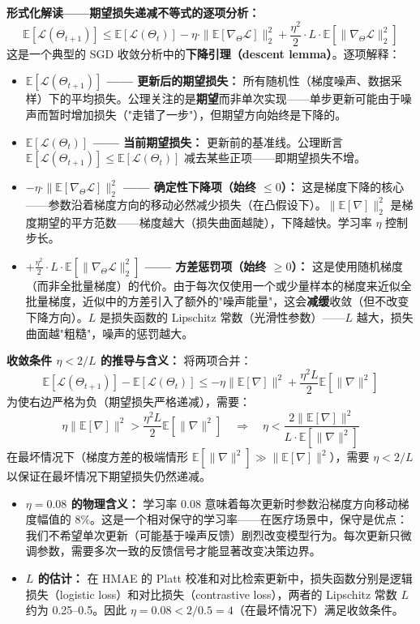 \documentclass[11pt,a4paper]{ctexart}
\theoremstyle{remark}
\begin{document}
\textbf{形式化解读——期望损失递减不等式的逐项分析：}
\[
\mathbb{E}[\mathcal{L}(\Theta_{t+1})] \leq \mathbb{E}[\mathcal{L}(\Theta_t)] - \eta \cdot \|\mathbb{E}[\nabla_\Theta \mathcal{L}]\|_2^2 + \frac{\eta^2}{2} \cdot L \cdot \mathbb{E}[\|\nabla_\Theta \mathcal{L}\|_2^2]
\]
这是一个典型的 SGD 收敛分析中的\textbf{下降引理（descent lemma）}。逐项解释：
\begin{itemize}[nosep]
\item \textbf{$\mathbb{E}[\mathcal{L}(\Theta_{t+1})]$ —— 更新后的期望损失：} 所有随机性（梯度噪声、数据采样）下的平均损失。公理关注的是\textbf{期望}而非单次实现——单步更新可能由于噪声而暂时增加损失（"走错了一步"），但期望方向始终是下降的。
\item \textbf{$\mathbb{E}[\mathcal{L}(\Theta_t)]$ —— 当前期望损失：} 更新前的基准线。公理断言 $\mathbb{E}[\mathcal{L}(\Theta_{t+1})] \leq \mathbb{E}[\mathcal{L}(\Theta_t)]$ 减去某些正项——即期望损失不增。
\item \textbf{$-\eta \cdot \|\mathbb{E}[\nabla_\Theta \mathcal{L}]\|_2^2$ —— 确定性下降项（始终 $\leq 0$）：} 这是梯度下降的核心——参数沿着梯度方向的移动必然减少损失（在凸假设下）。$\|\mathbb{E}[\nabla]\|_2^2$ 是梯度期望的平方范数——梯度越大（损失曲面越陡），下降越快。学习率 $\eta$ 控制步长。
\item \textbf{$+\frac{\eta^2}{2} \cdot L \cdot \mathbb{E}[\|\nabla_\Theta \mathcal{L}\|_2^2]$ —— 方差惩罚项（始终 $\geq 0$）：} 这是使用随机梯度（而非全批量梯度）的代价。由于每次仅使用一个或少量样本的梯度来近似全批量梯度，近似中的方差引入了额外的"噪声能量"，这会\textbf{减缓}收敛（但不改变下降方向）。$L$ 是损失函数的 Lipschitz 常数（光滑性参数）——$L$ 越大，损失曲面越"粗糙"，噪声的惩罚越大。
\end{itemize}

\textbf{收敛条件 $\eta < 2/L$ 的推导与含义：} 将两项合并：
\[
\mathbb{E}[\mathcal{L}(\Theta_{t+1})] - \mathbb{E}[\mathcal{L}(\Theta_t)] \leq -\eta \|\mathbb{E}[\nabla]\|^2 + \frac{\eta^2 L}{2} \mathbb{E}[\|\nabla\|^2]
\]
为使右边严格为负（期望损失严格递减），需要：
\[
\eta \|\mathbb{E}[\nabla]\|^2 > \frac{\eta^2 L}{2} \mathbb{E}[\|\nabla\|^2] \quad \Rightarrow \quad \eta < \frac{2\|\mathbb{E}[\nabla]\|^2}{L \cdot \mathbb{E}[\|\nabla\|^2]}
\]
在最坏情况下（梯度方差的极端情形 $\mathbb{E}[\|\nabla\|^2] \gg \|\mathbb{E}[\nabla]\|^2$），需要 $\eta < 2/L$ 以保证在最坏情况下期望损失仍然递减。
\begin{itemize}[nosep]
\item \textbf{$\eta = 0.08$ 的物理含义：} 学习率 0.08 意味着每次更新时参数沿梯度方向移动梯度幅值的 8\%。这是一个相对保守的学习率——在医疗场景中，保守是优点：我们不希望单次更新（可能基于噪声反馈）剧烈改变模型行为。每次更新只微调参数，需要多次一致的反馈信号才能显著改变决策边界。
\item \textbf{$L$ 的估计：} 在 HMAE 的 Platt 校准和对比检索更新中，损失函数分别是逻辑损失（logistic loss）和对比损失（contrastive loss），两者的 Lipschitz 常数 $L$ 约为 0.25--0.5。因此 $\eta = 0.08 < 2/0.5 = 4$（在最坏情况下）满足收敛条件。
\end{itemize}
\end{document}
